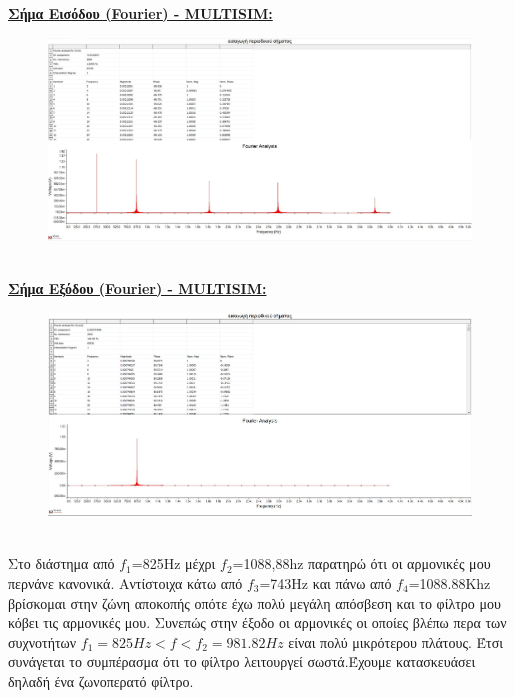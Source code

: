 \documentclass{article}
\begin{document}
{\clearpage
\textbf{\underline{Σήμα Εισόδου (Fourier) - MULTISIM:}}
\begin{figure}[h!]
\centering
 	\advance\leftskip-0.5cm
  \includegraphics[width=130mm,scale=2]{thema2/fmulin.jpg}
\end{figure}  \\[1.4\baselineskip]
\textbf{\underline{Σήμα Εξόδου (Fourier) - MULTISIM:}}
\begin{figure}[h!]
\centering
 	\advance\leftskip-0.5cm
  \includegraphics[width=130mm,scale=2]{thema2/fmulout.jpg}
\end{figure} \\
\normalsize{}
Στο διάστημα από $f_1$=825Ηz μέχρι $f_2$=1088,88hz παρατηρώ ότι οι αρμονικές
μου περνάνε κανονικά. Αντίστοιχα κάτω από $f_3$=743Hz και πάνω από
$f_4$=1088.88Khz βρίσκομαι στην ζώνη αποκοπής οπότε έχω πολύ μεγάλη απόσβεση και το φίλτρο μου κόβει τις αρμονικές μου. Συνεπώς στην έξοδο οι αρμονικές οι οποίες βλέπω περα των συχνοτήτων $f_1=825Hz < f < f_2 = 981.82Hz$
είναι πολύ μικρότερου πλάτους.
Έτσι συνάγεται το συμπέρασμα ότι το φίλτρο λειτουργεί σωστά.Έχουμε κατασκευάσει δηλαδή ένα ζωνοπερατό φίλτρο.
\large{}
\clearpage








}
\end{document}
